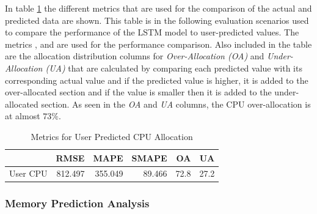       In table \ref{tab:metric-cpu-user-predicted} the different metrics that are used for the comparison of the actual and predicted data are shown. 
      This table is in the following evaluation scenarios used to compare the performance of the LSTM model to user-predicted values.
      The metrics ,   and  are used for the performance comparison.
      Also included in the table are the allocation distribution columns for \emph{Over-Allocation (OA)} and \emph{Under-Allocation (UA)} that are calculated by comparing each predicted value with its corresponding actual value and if the predicted value is higher, it is added to the over-allocated section and if the value is smaller then it is added to the under-allocated section.
      As seen in the \emph{OA} and \emph{UA} columns, the CPU over-allocation is at almost $73 \%$.
      \begin{table}
        \centering
        \caption{Metrics for User Predicted CPU Allocation}
        \label{tab:metric-cpu-user-predicted}
        \begin{tabular}{|l|rrrrr|}
          \toprule
          {} &     RMSE &     MAPE &   SMAPE &    OA &    UA \\
          \midrule
          User CPU &  812.497 &  355.049 &  89.466 &  72.8 &  27.2 \\
          \bottomrule
          \end{tabular}
      \end{table}

    \subsubsection{Memory Prediction Analysis}
    \label{sec:user-defined-memory-prediction-analysis-evaluation-scenario}

